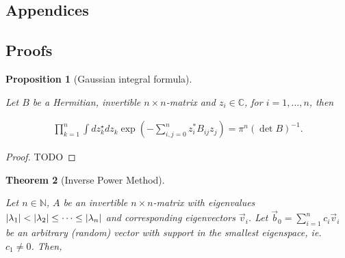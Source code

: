 \documentclass{article}
\theoremstyle{plain} %
\newtheorem{theorem}{Theorem}[section]
\newtheorem{prop}[theorem]{Proposition}
\theoremstyle{convention} %
\theoremstyle{remark} %
\numberwithin{equation}{section}
\begin{document}
\begin{appendix}

\section*{Appendices} %
\renewcommand{\thesubsection}{\Alph{subsection}} %

\renewcommand{\thetheorem}{\Alph{subsection}.\arabic{theorem}}
\renewcommand{\thedefinition}{\Alph{subsection}.\arabic{definition}}
\renewcommand{\thecorollary}{\Alph{subsection}.\arabic{corollary}}
\renewcommand{\theexample}{\Alph{subsection}.\arabic{example}}
\renewcommand{\theprop}{\Alph{subsection}.\arabic{prop}}
\renewcommand{\thelemma}{\Alph{subsection}.\arabic{lemma}}

\subsection{Proofs}

\label{sec:proofs}

\begin{prop}[Gaussian integral formula]

\label{prop:gauss_integral}

Let $B$ be a Hermitian, invertible $n \times n$-matrix and $z_i \in \mathbb{C}$, for $i = 1, \dots, n$, then

\begin{align*}
  \prod_{k=1}^n \int d z_k^{\star} d z_k \exp( - \sum_{i,j=0}^n z_i^{*} B_{ij} z_j ) = \pi^n (\det B)^{-1}.
\end{align*}

\end{prop}

\begin{proof}

TODO

\end{proof}

\begin{theorem}[Inverse Power Method]

\label{thm:inverse_power_method}

Let $n \in \mathbb{N}$, $A$ be an invertible $n \times n$-matrix with eigenvalues $\abs{\lambda_1} < \abs{\lambda_2} \leq \dots \leq \abs{\lambda_n}$ and corresponding eigenvectors $\vec{v}_i$. Let $\vec{b}_0 = \sum_{i=1}^n c_i \vec{v}_i$ be an arbitrary (random) vector with support in the smallest eigenspace, ie. $c_1 \neq 0$. Then,


\end{theorem}
\end{appendix}
\end{document}
